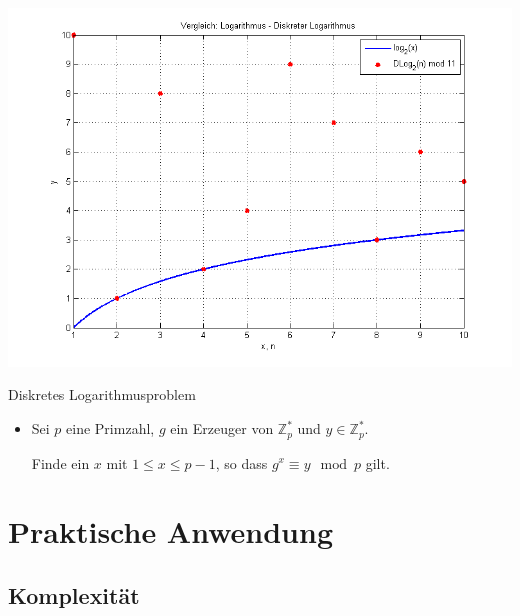 \documentclass[utf8]{beamer}
\newcommand{\Z}{\mathbb{Z}}
\begin{document}
\begin{frame}{\insertsubsectionhead}
  \begin{center}
    \includegraphics[width=\textwidth]{log_discLog.png}
  \end{center}
\end{frame}

\begin{frame}{Diskretes Logarithmusproblem}
  \begin{itemize}
    \item Sei $p$ eine Primzahl, $g$ ein Erzeuger von $\Z_p^*$ und $y \in
      \Z_p^*$.

      Finde ein $x$ mit $1 \leq x \leq p-1$, so dass $g^x \equiv y \mod
      p$ gilt.
  \end{itemize}
\end{frame}

\section{Praktische Anwendung}
\label{sec:praktische_anwendung}

\subsection{Komplexität}
\label{sub:komplexitat}
\end{document}
